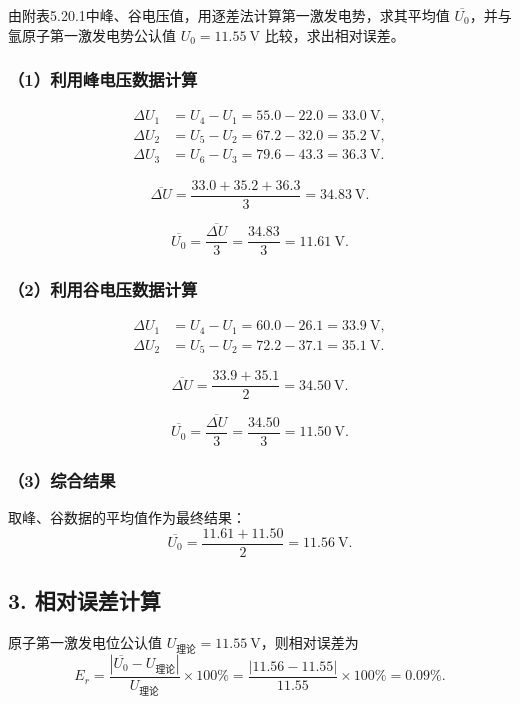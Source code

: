 \documentclass[UTF8,a4paper,zihao=-4]{ctexart}
\begin{document}
由附表5.20.1中峰、谷电压值，用逐差法计算第一激发电势，求其平均值 \(\overline{U_0}\)，并与氩原子第一激发电势公认值 \(U_0 = 11.55\ \text{V}\) 比较，求出相对误差。

\subsubsection*{（1）利用峰电压数据计算}

\[
\begin{aligned}
\Delta U_1 &= U_4 - U_1 = 55.0 - 22.0 = 33.0\ \text{V}, \\
\Delta U_2 &= U_5 - U_2 = 67.2 - 32.0 = 35.2\ \text{V}, \\
\Delta U_3 &= U_6 - U_3 = 79.6 - 43.3 = 36.3\ \text{V}.
\end{aligned}
\]

\[
\overline{\Delta U} = \frac{33.0 + 35.2 + 36.3}{3} = 34.83\ \text{V}.
\]

\[
\overline{U_0} = \frac{\overline{\Delta U}}{3} = \frac{34.83}{3} = 11.61\ \text{V}.
\]

\subsubsection*{（2）利用谷电压数据计算}

\[
\begin{aligned}
\Delta U_1 &= U_4 - U_1 = 60.0 - 26.1 = 33.9\ \text{V}, \\
\Delta U_2 &= U_5 - U_2 = 72.2 - 37.1 = 35.1\ \text{V}.
\end{aligned}
\]

\[
\overline{\Delta U} = \frac{33.9 + 35.1}{2} = 34.50\ \text{V}.
\]

\[
\overline{U_0} = \frac{\overline{\Delta U}}{3} = \frac{34.50}{3} = 11.50\ \text{V}.
\]

\subsubsection*{（3）综合结果}

取峰、谷数据的平均值作为最终结果：
\[
\overline{U_0} = \frac{11.61 + 11.50}{2} = 11.56\ \text{V}.
\]

\subsection*{3. 相对误差计算}

原子第一激发电位公认值 \(U_{\text{理论}} = 11.55\ \text{V}\)，则相对误差为
\[
E_r = \frac{|\overline{U_0} - U_{\text{理论}}|}{U_{\text{理论}}} \times 100\%
= \frac{|11.56 - 11.55|}{11.55} \times 100\%
= 0.09\%.
\]
\end{document}
